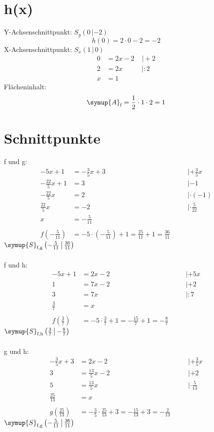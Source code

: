 \section*{h(x)}
Y-Achsenschnittpunkt: $S_y (0\,|-2)$
\begin{equation}
      h(0)=2\cdot 0-2=-2
\end{equation}
X-Achsenschnittpunkt: $S_x (1\,|\,0)$
\begin{align}
      0&=2x-2\;\;\;\;|\!+\!2\\
      2&=2x\;\;\;\;\;\;\;\;\;\;|\!:\!2\\
      x&=1
\end{align}
Flächeninhalt:
\begin{equation}
      \symup{A}_\text{f} = \frac{1}{2}\cdot1\cdot2=1
\end{equation}

\section*{Schnittpunkte}
f und g:
\begin{align}
    -5x+1&=-\frac{3}{5}x+3 &\quad& |+\frac{3}{5}x \\
      -\frac{22}{5}x+1&=3 && |-1 \\
      -\frac{22}{5}x&=2 && | \cdot\!(-1)\\
      \frac{22}{5}x&=-2 && | \cdot\!\frac{5}{22}\\
      x&=-\frac{5}{11} \\\\
      f\left(-\frac{5}{11}\right)&=-5\cdot\left(-\frac{5}{11}\right)+1=\frac{25}{11}+1=\frac{36}{11}
\end{align}
$\symup{S}_\text{f,g}\left(-\frac{5}{11}\,\middle|\,\frac{36}{11}\right)$\\\\
f und h:
\begin{align}
    -5x+1&=2x-2 &\quad& | +5x\\
      1&=7x-2 && | +2\\
      3&=7x && | :7\\
      \frac{3}{7}&=x\\\\
      f\left(\frac{3}{7}\right)&=-5\cdot\frac{3}{7}+1=-\frac{15}{7}+1=-\frac{8}{7}
\end{align}
$\symup{S}_\text{f,h}\left(\frac{3}{7}\,\middle|\,-\frac{8}{7}\right)$\\\\
g und h:
\begin{align}
    -\frac{3}{5}x+3&=2x-2&\quad& | +\frac{3}{5}x\\
      3&=\frac{13}{5}x-2 && | +2\\
      5&=\frac{13}{5}x && | \cdot\!\frac{5}{13}\\
      \frac{25}{13}&=x \\\\
      g\left(\frac{25}{13}\right)&=-\frac{3}{5}\cdot\frac{25}{13}+3=-\frac{15}{13}+3=-\frac{2}{13}
\end{align}
$\symup{S}_\text{f,g}\left(-\frac{5}{11}\,\middle|\,\frac{36}{11}\right)$


